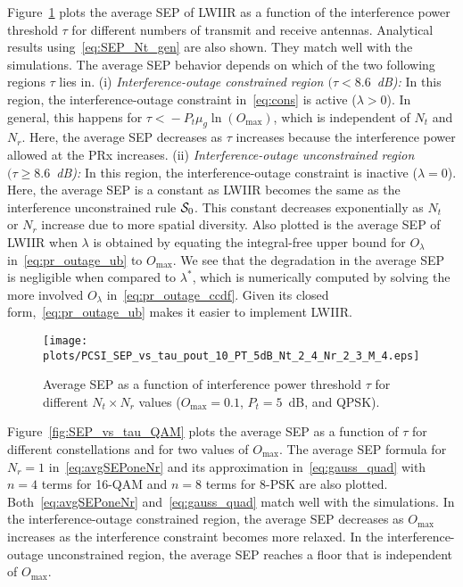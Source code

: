 \documentclass[12pt,draftcls,peerreview,onecolumn]{IEEEtran}
\newcommand{\lam}{\lambda}
\newcommand{\mug}{{\mu_{g}}}
\newcommand{\Nt}{{N_t}}
\newcommand{\Nr}{{N_r}}
\newcommand{\Pt}{{P_t}}
\newcommand{\outmax}{O_{\text{max}}}
\newcommand{\itau}{\tau}
\newcommand{\out}{O}
\newcommand{\caluncons}{{\cal S_{\text{0}}}}
\newcommand{\outlam}{\out_{\lam}}
\begin{document}
Figure~\ref{fig:SEP_vs_tau} plots the average SEP of LWIIR as a function of the interference power threshold $\itau$ for different numbers of transmit and receive antennas. Analytical results using~\eqref{eq:SEP_Nt_gen} are also shown. They match well with the simulations. The average SEP behavior depends on which of the two following regions $\itau$ lies in. (i) {\em Interference-outage constrained region $(\itau < 8.6$~dB):} In this region, the interference-outage constraint in~\eqref{eq:cons} is active ($\lam>0$). In general, this happens for $\itau\!<\!-\Pt\mug\ln\left(\outmax\right)$, which is independent of $\Nt$ and $\Nr$. Here, the average SEP decreases as $\itau$ increases because the interference power allowed at the PRx increases. (ii) {\em Interference-outage unconstrained region $(\itau \geq 8.6$~dB):} In this region, the interference-outage constraint is inactive ($\lam=0$). Here, the average SEP is a constant as LWIIR becomes the same as the interference unconstrained rule $\caluncons$. This constant decreases exponentially as $\Nt$ or $\Nr$ increase due to more spatial diversity. Also plotted is the average SEP of LWIIR when $\lam$ is obtained by equating the integral-free upper bound for $\outlam$ in~\eqref{eq:pr_outage_ub} to $\outmax$. We see that the degradation in the average SEP  is negligible when compared to $\lam^*$, which is numerically computed by solving the more involved $\outlam$ in~\eqref{eq:pr_outage_ccdf}. Given its closed form,~\eqref{eq:pr_outage_ub} makes it easier to implement LWIIR. 



\begin{figure}
  \centering \texttt{[image: plots/PCSI\_SEP\_vs\_tau\_pout\_10\_PT\_5dB\_Nt\_2\_4\_Nr\_2\_3\_M\_4.eps]}
  \caption{Average SEP as a function of interference power threshold $\itau$ for different $\Nt \times \Nr$ values ($\outmax=0.1$,  $\Pt = 5$~dB, and QPSK).}
\label{fig:SEP_vs_tau}
\end{figure}

Figure~\ref{fig:SEP_vs_tau_QAM} plots the average SEP as a function of  $\itau$ for different constellations %
and for two values of $\outmax$. The %
average SEP formula for $\Nr=1$ in~\eqref{eq:avgSEPoneNr} and its approximation in~\eqref{eq:gauss_quad} with $n\!=\!4$ terms for 16-QAM and $n\!=\!8$ terms for 8-PSK are also plotted. %
Both~\eqref{eq:avgSEPoneNr} and~\eqref{eq:gauss_quad} match well with the simulations.
 In the interference-outage constrained region, the average SEP decreases as $\outmax$ increases as the interference constraint becomes more relaxed. In the interference-outage unconstrained region, the average SEP reaches a floor that is  independent of $\outmax$.  %
\end{document}
